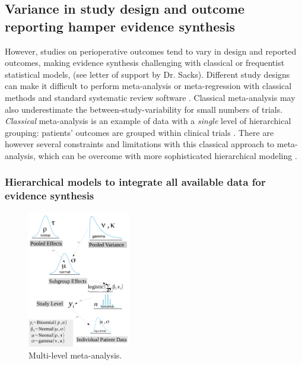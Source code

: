 \documentclass[11pt,notitlepage]{article}
\begin{document}
\subsection*{Variance in study design and outcome reporting hamper evidence synthesis}
However, studies on perioperative outcomes tend to vary in design and reported outcomes\cite{Andreae2013}, making evidence synthesis challenging with classical or frequentist statistical models\cite{Spiegelhalter_11134920}, (see letter of support by Dr. Sacks). Different study designs can make it difficult to perform meta-analysis or meta-regression with classical methods and standard systematic review software \cite{Deeks2011chapter}. Classical meta-analysis may also underestimate the between-study-variability for small numbers of trials\cite{Song2012,Cornell2014,Andreae2015}. \textit{Classical} meta-analysis is an example of data with a \textit{single} level of hierarchical grouping: patients' outcomes are grouped within clinical trials \cite{egger2008systematic}. There are however several constraints and limitations with this classical approach to meta-analysis, which can be overcome with more sophisticated hierarchical modeling  \cite{Andreae2015,Thompson2002,Abroug2011}. 

\subsubsection*{Hierarchical models to integrate all available data for evidence synthesis}

\begin{figure} 
\includegraphics[width=0.4\textwidth]{Figures/DistrogramMultiLevelMetaAnalysis.pdf} 
\caption{\footnotesize Multi-level meta-analysis.}
\label{fig:MetaAnalysis}
\end{figure}
\end{document}

